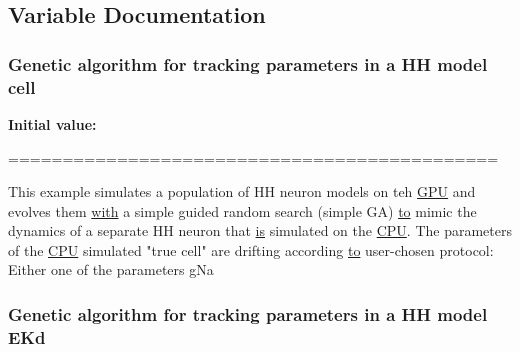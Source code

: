 \subsection{Variable Documentation}
\hypertarget{userproject_2HHVclampGA__project_2README_8txt_a5d234027a467b607e3f851248a184a28}{
\subsubsection[{cell}]{\setlength{\rightskip}{0pt plus 5cm}Genetic algorithm for tracking parameters {\bf in} a H\+H {\bf model} cell}}\label{userproject_2HHVclampGA__project_2README_8txt_a5d234027a467b607e3f851248a184a28}
{\bfseries Initial value\+:}
\begin{DoxyCode}
=============================================

This example simulates a population of HH neuron models on teh \hyperlink{modelSpec_8h_a39cb9803524b6f3b783344b2f89867b4}{GPU} and evolves them 
      \hyperlink{userproject_2OneComp__project_2README_8txt_ace09bb40fbf4457ad9a9340a67a4fa9a}{with} a simple 
guided random search (simple GA) \hyperlink{README_8txt_add1f2ee32acc15ef77f839d4382c9768}{to} mimic the dynamics of a separate HH
neuron that \hyperlink{userproject_2MBody1__project_2README_8txt_aac3f20bc10af7f579c0fa075cf788fcc}{is} simulated on the \hyperlink{README_8txt_a74a069e3c75797de2636c4dd14daa147}{CPU}. The parameters of the \hyperlink{README_8txt_a74a069e3c75797de2636c4dd14daa147}{CPU} simulated \textcolor{stringliteral}{"true cell"} are drifting 
according \hyperlink{README_8txt_add1f2ee32acc15ef77f839d4382c9768}{to} user-chosen protocol: Either one of the parameters gNa
\end{DoxyCode}
\hypertarget{userproject_2HHVclampGA__project_2README_8txt_aa018d242c8c0d18f1c4ac5a22a5368b7}{
\subsubsection[{E\+Kd}]{\setlength{\rightskip}{0pt plus 5cm}Genetic algorithm for tracking parameters {\bf in} a H\+H {\bf model} E\+Kd}}\label{userproject_2HHVclampGA__project_2README_8txt_aa018d242c8c0d18f1c4ac5a22a5368b7}
